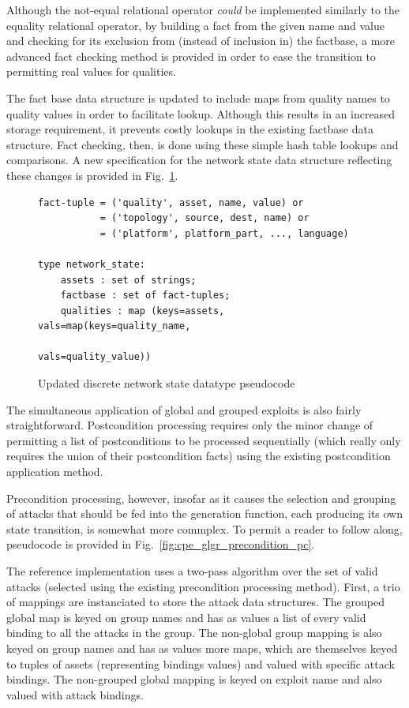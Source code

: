 Although the not-equal relational operator \emph{could} be implemented
similarly to the equality relational operator, by building a fact from the
given name and value and checking for its exclusion from (instead of inclusion 
in) the factbase, a more advanced fact checking method is provided in order 
to ease the transition to permitting real values for qualities.

The fact base data structure is updated to include maps from quality names to
quality values in order to facilitate lookup. Although this results in an
increased storage requirement, it prevents costly lookups in the existing
factbase data structure. Fact checking, then, is done using these simple hash
table lookups and comparisons. A new specification for the network state
data structure reflecting these changes is provided in 
Fig.~\ref{fig:netstate_map_pc}.

\begin{figure}
\begin{lstlisting}
fact-tuple = ('quality', asset, name, value) or
           = ('topology', source, dest, name) or
           = ('platform', platform_part, ..., language)

type network_state:
    assets : set of strings;
    factbase : set of fact-tuples;
    qualities : map (keys=assets, vals=map(keys=quality_name,
                                           vals=quality_value))
\end{lstlisting}
\caption{Updated discrete network state datatype pseudocode}
\label{fig:netstate_map_pc}
\end{figure}

The simultaneous application of global and grouped exploits is also
fairly straightforward. Postcondition processing requires only the minor change
of permitting a list of postconditions to be processed sequentially (which
really only requires the union of their postcondition facts) using the
existing postcondition application method.

Precondition processing, however, insofar as it causes the selection and
grouping of attacks that should be fed into the generation function,
each producing its own state transition, is somewhat more commplex. To permit
a reader to follow along, pseudocode is provided in 
Fig.~\ref{fig:cpe_glgr_precondition_pc}.

The reference implementation uses a two-pass algorithm over the set of
valid attacks (selected using the existing precondition processing method).
First, a trio of mappings are instanciated to store the attack data structures.
The grouped global map is keyed on group names and has as values a list of every
valid binding to all the attacks in the group.
The non-global group mapping is also keyed on group names and has as values more maps, which are
themselves keyed to tuples of assets (representing bindings values) and valued
with specific attack bindings. The non-grouped global mapping is keyed on exploit name
and also valued with attack bindings.

